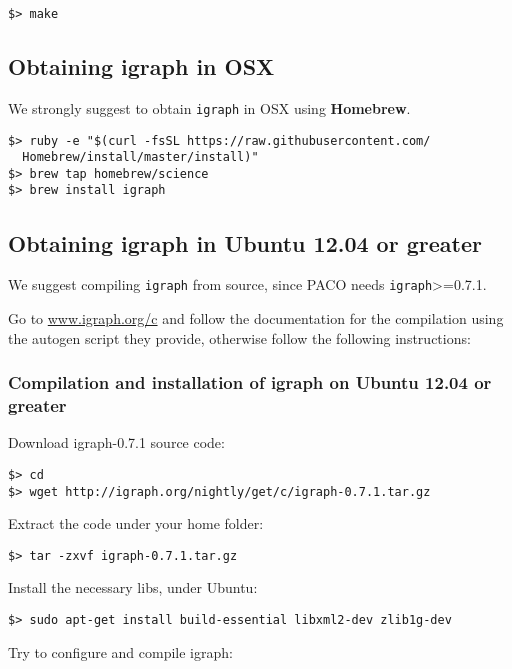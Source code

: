 \documentclass[11pt,%
              a4paper,%
]{article}
\begin{document}
\begin{verbatim}
$> make
\end{verbatim}

\subsection{Obtaining igraph in OSX}\label{obtaining-igraph-in-osx}

We strongly suggest to obtain \texttt{igraph} in OSX using
\textbf{Homebrew}.

\begin{verbatim}
$> ruby -e "$(curl -fsSL https://raw.githubusercontent.com/
  Homebrew/install/master/install)"
$> brew tap homebrew/science
$> brew install igraph
\end{verbatim}

\subsection{Obtaining igraph in Ubuntu 12.04 or
greater}

We suggest compiling \texttt{igraph} from source, since PACO needs
\texttt{igraph}\textgreater{}=0.7.1.

Go to \url{www.igraph.org/c} and follow the documentation for the compilation using the autogen script they provide, otherwise follow the following instructions:

\subsubsection{Compilation and installation of igraph on Ubuntu 12.04 or
greater}\label{compilation-and-installation-of-igraph-on-ubuntu-12.04-or-greater}

Download igraph-0.7.1 source code:

\begin{verbatim}
$> cd
$> wget http://igraph.org/nightly/get/c/igraph-0.7.1.tar.gz
\end{verbatim}
Extract the code under your home folder:

\begin{verbatim}
$> tar -zxvf igraph-0.7.1.tar.gz
\end{verbatim}
Install the necessary libs, under Ubuntu:

\begin{verbatim}
$> sudo apt-get install build-essential libxml2-dev zlib1g-dev
\end{verbatim}
Try to configure and compile igraph:
\end{document}
